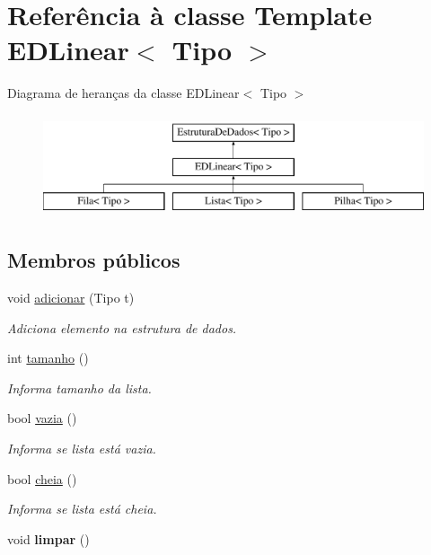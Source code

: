 \hypertarget{classEDLinear}{\section{Referência à classe Template E\-D\-Linear$<$ Tipo $>$}
\label{classEDLinear}
}
Diagrama de heranças da classe E\-D\-Linear$<$ Tipo $>$\begin{figure}[H]
\begin{center}
\leavevmode
\includegraphics[height=3.000000cm]{classEDLinear}
\end{center}
\end{figure}
\subsection*{Membros públicos}
\begin{DoxyCompactItemize}
\item 
void \hyperlink{classEDLinear_af867a99c232007c2c11fd84cdbe603d3}{adicionar} (Tipo t)
\begin{DoxyCompactList}\small\item\em Adiciona elemento na estrutura de dados. \end{DoxyCompactList}\item 
int \hyperlink{classEDLinear_a5f36413e1900ef421dfbed681f303675}{tamanho} ()
\begin{DoxyCompactList}\small\item\em Informa tamanho da lista. \end{DoxyCompactList}\item 
bool \hyperlink{classEDLinear_a29e7eaef660cda7d95897917b1b1973f}{vazia} ()
\begin{DoxyCompactList}\small\item\em Informa se lista está vazia. \end{DoxyCompactList}\item 
bool \hyperlink{classEDLinear_a8187f3ef636dc2d82e84fa10dc27456d}{cheia} ()
\begin{DoxyCompactList}\small\item\em Informa se lista está cheia. \end{DoxyCompactList}\item 
\hypertarget{classEDLinear_ae57113a1f9b4b63f73aeea99deda939d}{void {\bfseries limpar} ()}\label{classEDLinear_ae57113a1f9b4b63f73aeea99deda939d}

\end{DoxyCompactItemize}
